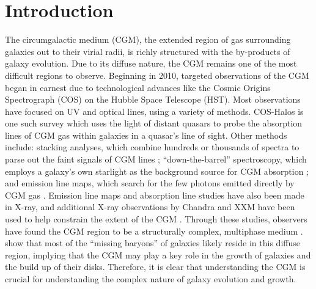 \documentclass[]{emulateapj}
\begin{document}
\section{Introduction} 
\label{sec-intro}

The circumgalactic medium (CGM), the extended region of gas surrounding galaxies out to their virial radii, is richly structured with the by-products of galaxy evolution. Due to its diffuse nature, the CGM remains one of the most difficult regions to observe. Beginning in 2010, targeted observations of the CGM began in earnest due to technological advances like the Cosmic Origins Spectrograph (COS) on the Hubble Space Telescope (HST). Most observations have focused on UV and optical lines, using a variety of methods. COS-Halos is one such survey which uses the light of distant quasars to probe the absorption lines of CGM gas within galaxies in a quasar's line of sight. Other methods include: stacking analyses, which combine hundreds or thousands of spectra to parse out the faint signals of CGM lines \citep{York2006,Peek2015,Steidel2010}; ``down-the-barrel'' spectroscopy, which employs a galaxy's own starlight as the background source for CGM absorption \citep{Martin2006,Bordoloi2011,Rubin2014,Heckman2015}; and emission line maps, which search for the few photons emitted directly by CGM gas \citep{Putman2012a,Hayes2016}. Emission line maps and absorption line studies have also been made in X-ray, and additional X-ray observations by Chandra and XXM have been used to help constrain the extent of the CGM \citep{Nicastro2005}. Through these studies, observers have found the CGM region to be a structurally complex, multiphase medium \citep{Tumlinson2011,Werk2012,Werk2013a,Werk2016,Tumlinson2017}. \cite{Werk2014} show that most of the ``missing baryons'' of galaxies likely reside in this diffuse region, implying that the CGM may play a key role in the growth of galaxies and the build up of their disks. Therefore, it is clear that understanding the CGM is crucial for understanding the complex nature of galaxy evolution and growth. 
\end{document}
